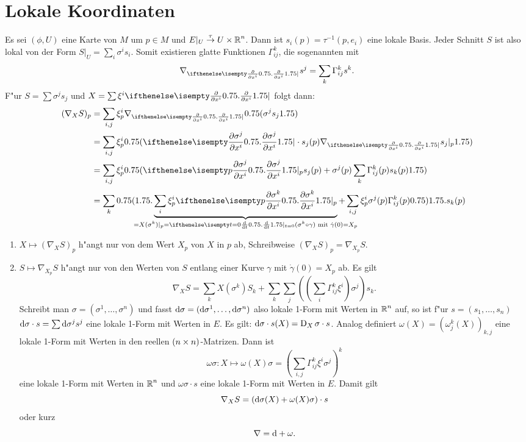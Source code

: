 \section{Lokale Koordinaten}

Es sei $(\phi, U)$ eine Karte von $M$ um $p \in M$ und $E|_U \overset{\tau}{\to} U \times \operatorname{\mathbb{R}}^n$. Dann ist $s_i(p) = \tau^{-1}(p, e_i)$ eine lokale Basis. Jeder Schnitt $S$ ist also lokal von der Form $S|_U = \sum_i \sigma^{i} s_i$. Somit existieren glatte Funktionen $\Gamma_{ij}^k$, die sogenannten  mit 
	\[ \nabla_{\pdifffrac{}{x^{i}}} s^j = \sum_k \Gamma_{ij}^k s^k. \]
F"ur $S = \sum \sigma^j s_j$ und $X = \sum \xi^{i} \pdifffrac{}{x^{i}}$ folgt dann:
\begin{align*}
	(\nabla_XS)_p &= \sum_{i,j} \xi_p^{i} \nabla_{\pdifffrac{}{x^{i}}} \left(\sigma^j s_j\right)\\
	&= \sum_{i,j} \xi_p^{i} \left(\pdifffrac{\sigma^j}{x^{i}} \cdot s_j(p) \nabla_{\pdifffrac{}{x^{i}}} s_j|_p\right)\\
	&= \sum_{i,j} \xi_p^{i} \left(\pdifffrac[p]{\sigma^j}{x^{i}} s_j(p) + \sigma^j(p) \sum_k \Gamma_{ij}^k(p) s_k(p)\right)\\
	&= \sum_k \Bigg(\underbrace{\sum_i \xi_p^{i} \pdifffrac[p]{\sigma^k}{x^{i}}}_{\mathclap{= X(\sigma^k)|_p = \difffrac[t=0]{}{t} (\sigma^k \circ \gamma) \text{ mit } \dot\gamma(0) = X_p}} + \sum_{i,j} \xi_p^{i} \sigma^j(p) \Gamma_{ij}^k(p)\Bigg) s_k(p)
\end{align*}

\begin{bem}\begin{enumerate}[label=\arabic*),leftmargin=*]
\item
	$X \mapsto (\nabla_XS)_p$ h"angt nur von dem Wert $X_p$ von  $X$ in $p$ ab, Schreibweise $(\nabla_XS)_p = \nabla_{X_p}S$.
\item
	$S \mapsto \nabla_{X_p}S$ h"angt nur von den Werten von $S$ entlang einer Kurve $\gamma$ mit $\dot\gamma(0) = X_p$ ab. Es gilt
		\[ \nabla_XS = \sum_k X(\sigma^k)S_k + \sum_k \sum_j\left(\left(\sum_i \Gamma_{ij}^k \xi^{i}\right) \sigma^j\right) s_k. \]
	Schreibt man $\sigma = (\sigma^1,\ldots ,\sigma^n)$ und fasst $\mathrm{d} \sigma = (\mathrm{d} \sigma^1,\ldots ,\mathrm{d} \sigma^n)$ also lokale 1-Form mit Werten in $\operatorname{\mathbb{R}}^n$ auf, so ist f"ur $s=(s_1,\ldots ,s_n)$ $\mathrm{d}\sigma \cdot s = \sum \mathrm{d} \sigma^j s^j$ eine lokale 1-Form mit Werten in $E$. Es gilt: $\mathrm{d} \sigma \cdot s(X) = \operatorname{D}_X \sigma \cdot s$. Analog definiert $\omega(X) = (\omega_j^k(X))_{k,j}$ eine lokale 1-Form mit Werten in den reellen $(n\times n)$-Matrizen. Dann ist 
	\[ \omega \sigma : X \mapsto \omega(X) \sigma = \left( \sum_{i,j} \Gamma_{ij}^k \xi^{i} \sigma^j \right)^k \]
eine lokale 1-Form mit Werten in $\operatorname{\mathbb{R}}^n$ und $\omega\sigma \cdot s$ eine lokale 1-Form mit Werten in $E$. Damit gilt
	\[ \nabla_XS = (\mathrm{d} \sigma(X) + \omega(X) \sigma) \cdot s \]
oder kurz
	\[ \nabla = \mathrm{d} + \omega. \]
\end{enumerate}\end{bem}

